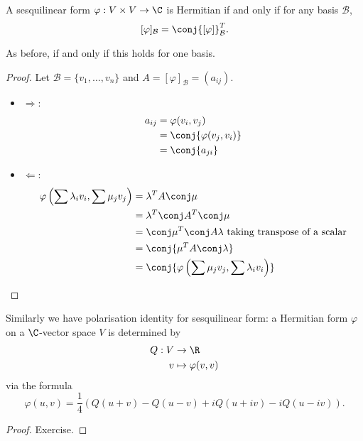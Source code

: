 \documentclass[a4paper]{article}
\newcommand*{\basis}{\mathcal}
\theoremstyle{definition}
\begin{document}
\begin{lemma}
  A sesquilinear form \(\varphi: V \times V \to \C\) is Hermitian if and only if for any basis \(\basis B\),
  \[
    [\varphi]_{\basis B} = \conj{[\varphi]}^T_{\basis B}.
  \]
\end{lemma}

As before, if and only if this holds for one basis.

\begin{proof}
  Let \(\basis B = \{v_1, \dots, v_n\}\) and \(A = [\varphi]_{\basis B} = (a_{ij})\).
  \begin{itemize}
  \item \(\Rightarrow\):
    \begin{align*}
      a_{ij} &= \varphi(v_i, v_j) \\
             &= \conj{\varphi(v_j, v_i)} \\
      &= \conj{a_{ji}}
    \end{align*}
  \item \(\Leftarrow\):
    \begin{align*}
      \varphi \left( \sum \lambda_iv_i, \sum \mu_jv_j \right) &= \lambda^T A \conj \mu \\
                                                              &= \lambda^T \conj A^T \conj \mu \\
                                                              &= \conj \mu^T \conj A \lambda \text{ taking transpose of a scalar} \\
                                                              &= \conj{\mu^T A \conj \lambda} \\
                                                              &= \conj{\varphi \left( \sum \mu_jv_j, \sum \lambda_iv_i \right)}
    \end{align*}
  \end{itemize}
\end{proof}

Similarly we have polarisation identity for sesquilinear form: a Hermitian form \(\varphi\) on a \(\C\)-vector space \(V\) is determined by
\begin{align*}
  Q: V &\to \R \\
  v &\mapsto \varphi(v, v)
\end{align*}
via the formula
\[
  \varphi(u, v) = \frac{1}{4} \left( Q(u + v) - Q(u - v) + i Q(u + iv) - i Q(u - iv) \right).
\]

\begin{proof}
  Exercise.
\end{proof}
\end{document}
